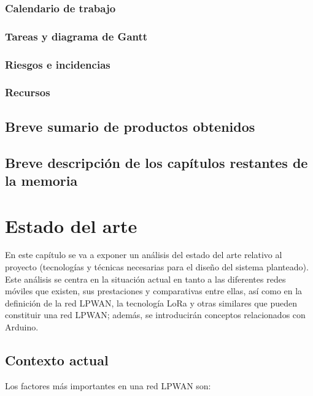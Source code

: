 \documentclass[12pt]{article}
\begin{document}
	\subsubsection[Calendario de trabajo]{Calendario de trabajo}
	\subsubsection[Tareas y diagrama de Gantt]{Tareas y diagrama de Gantt}
	\subsubsection[Riesgos e incidencias]{Riesgos e incidencias}
	\subsubsection[Recursos]{Recursos}
	\subsection[Breve sumario de productos obtenidos]{Breve sumario de productos obtenidos}
	\subsection[Breve descripción de los capítulos restantes de la memoria]{Breve descripción de los capítulos restantes de la memoria}
	
	\pagebreak
	
	\section[Estado del arte]{Estado del arte}  
	
	En este capítulo se va a exponer un análisis del estado del arte relativo al proyecto (tecnologías y técnicas necesarias para el diseño del sistema planteado). Este análisis se centra en la situación actual en tanto a las diferentes redes móviles que existen, sus prestaciones y comparativas entre ellas, así como en la definición de la red LPWAN, la tecnología LoRa y otras similares que pueden constituir una red LPWAN; además, se introducirán conceptos relacionados con Arduino.
	


	\subsection[Contexto actual]{Contexto actual}
	
	Los factores más importantes en una red LPWAN son:
	
\end{document}
